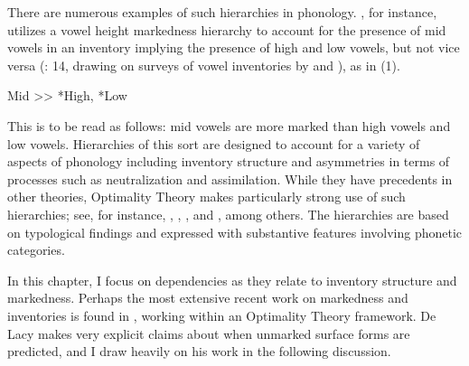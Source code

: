 \documentclass[output=paper]{langsci/langscibook}
\begin{document}
 There are numerous examples of such hierarchies in phonology. \citet{Beckman1997}, for instance, utilizes a vowel height markedness hierarchy to account for the presence of mid vowels in an inventory implying the presence of high and low vowels, but not vice versa (\citealt{Beckman1997}: 14, drawing on surveys of vowel inventories by \citealt{Crothers1978} and \citealt{Disner1984}), as in (1).

\ea%
\label{ex:1}
    \ea  *Mid {\textgreater}{\textgreater} *High, *Low 
    \z
    \z


 This is to be read as follows: mid vowels are more marked than high vowels and low vowels. Hierarchies of this sort are designed to account for a variety of aspects of phonology including inventory structure and asymmetries in terms of processes such as neutralization and assimilation. While they have precedents in other theories, Optimality Theory makes particularly strong use of such hierarchies; see, for instance, \citet{Beckman1997}, \citet{Lombardi2002}, \citet{Hayes2004}, and \citet{DeLacy2006}, among others. The hierarchies are based on typological findings and expressed with substantive features involving phonetic categories. 

  In this chapter, I focus on dependencies as they relate to inventory structure and markedness. Perhaps the most extensive recent work on markedness and inventories is found in \citet{DeLacy2006}, working within an Optimality Theory framework. De Lacy makes very explicit claims about when unmarked surface forms are predicted, and I draw heavily on his work in the following discussion.
\end{document}
